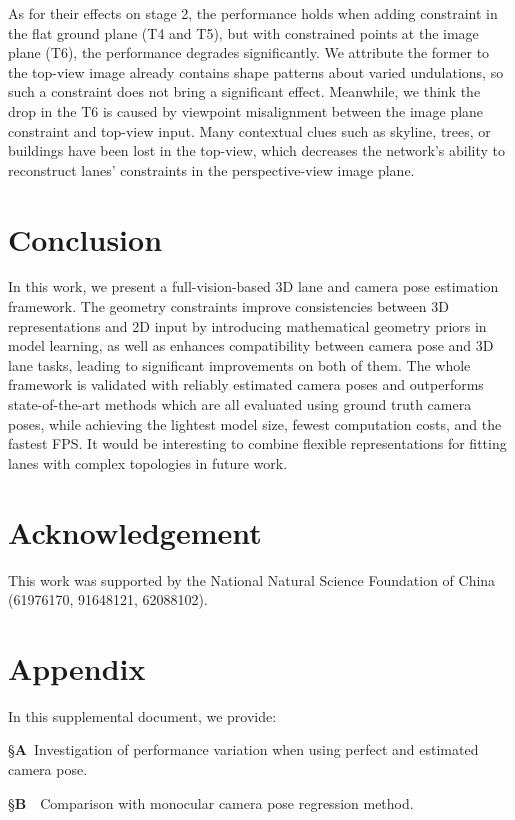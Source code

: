 \documentclass[letterpaper]{article} \usepackage{aaai22}  \usepackage{times}  \usepackage{helvet}  \usepackage{courier}  \usepackage[hyphens]{url}  \usepackage{graphicx} \urlstyle{rm} \def\UrlFont{\rm}  \usepackage{natbib}  \usepackage{caption}
\begin{document}
As for their effects on stage 2, the performance holds when adding constraint in the flat ground plane (T4 and T5), but with constrained points at the image plane (T6), the performance degrades significantly. We attribute the former to the top-view image already contains shape patterns about varied undulations, so such a constraint does not bring a significant effect. Meanwhile, we think the drop in the T6 is caused by viewpoint misalignment between the image plane constraint and top-view input. Many contextual clues such as skyline, trees, or buildings have been lost in the top-view, which decreases the network's ability to reconstruct lanes' constraints in the perspective-view image plane.   


\section{Conclusion}
In this work, we present a full-vision-based 3D lane and camera pose estimation framework. The geometry constraints improve consistencies between 3D representations and 2D input by introducing mathematical geometry priors in model learning, as well as enhances compatibility between camera pose and 3D lane tasks, leading to significant improvements on both of them. The whole framework is validated with reliably estimated camera poses and outperforms state-of-the-art methods which are all evaluated using ground truth camera poses, while achieving the lightest model size, fewest computation costs, and the fastest FPS. 
It would be interesting to combine flexible representations for fitting lanes with complex topologies in future work.

\section{Acknowledgement}
This work was supported by the National Natural Science Foundation of China (61976170, 91648121, 62088102).



\section{Appendix}
In this supplemental document, we provide:


\S \textbf{A}~Investigation of performance variation when using perfect and estimated camera pose.

\S \textbf{B}~~Comparison with monocular camera pose regression method.
\end{document}
